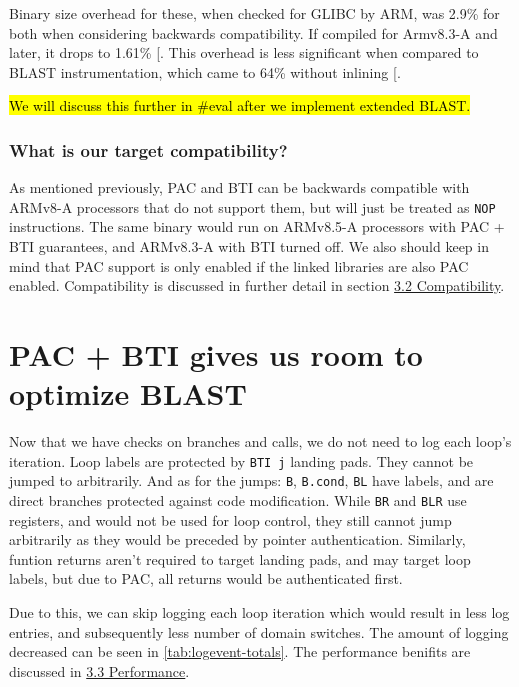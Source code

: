 \documentclass[a4paper, nobind]{templates/ociamthesis}
\begin{document}
Binary size overhead for these, when checked for GLIBC by ARM, was 2.9\% for both
when considering backwards compatibility. If compiled for Armv8.3-A and later,
it drops to 1.61\% {[}\citeproc{ref-arm-pacbti}{9}{]}.
This overhead is less significant when compared to BLAST instrumentation, which
came to 64\% without inlining {[}\citeproc{ref-blast}{55}{]}.

\hl{We will discuss this further in \#eval after we implement extended BLAST.}

\subsubsection{What is our target compatibility?}\label{what-is-our-target-compatibility}

As mentioned previously, PAC and BTI can be backwards compatible with ARMv8-A processors
that do not support them, but will just be treated as \texttt{NOP} instructions.
The same binary would run on ARMv8.5-A processors with PAC + BTI guarantees, and
ARMv8.3-A with BTI turned off.
We also should keep in mind that PAC support is only enabled if the linked libraries
are also PAC enabled.
Compatibility is discussed in further detail in section \hyperref[compatibility]{3.2 Compatibility}.

\section{PAC + BTI gives us room to optimize BLAST}\label{optimizing-blast}

Now that we have checks on branches and calls, we do not need to log each loop's iteration.
Loop labels are protected by \texttt{BTI\ j} landing pads. They cannot be jumped to arbitrarily.
And as for the jumps: \texttt{B}, \texttt{B.cond}, \texttt{BL} have labels, and are direct branches protected
against code modification.
While \texttt{BR} and \texttt{BLR} use registers, and would not be used for loop control,
they still cannot jump arbitrarily as they would be preceded by pointer authentication.
Similarly, funtion returns aren't required to target landing pads, and may target loop labels,
but due to PAC, all returns would be authenticated first.

Due to this, we can skip logging each loop iteration which would result in less
log entries, and subsequently less number of domain switches. The amount of logging
decreased can be seen in \ref{tab:logevent-totals}.
The performance benifits are discussed in \hyperref[performance]{3.3 Performance}.
\end{document}
